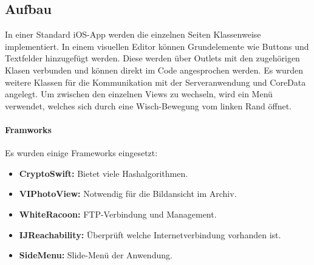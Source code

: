 \subsection{Aufbau}
In einer Standard iOS-App werden die einzelnen Seiten Klassenweise implementiert. In einem visuellen Editor können Grundelemente wie Buttons und Textfelder hinzugefügt werden. Diese werden über Outlets mit den zugehörigen Klasen verbunden und können direkt im Code angesprochen werden. Es wurden weitere Klassen für die Kommunikation mit der Serveranwendung und CoreData angelegt. Um zwischen den einzelnen Views zu wechseln, wird ein Menü verwendet, welches sich durch eine Wisch-Bewegung vom linken Rand öffnet. 

\paragraph{Framworks} Es wurden einige Frameworks eingesetzt:
\begin{itemize}
	\item \textbf{CryptoSwift:} Bietet viele Hashalgorithmen. 
	\item \textbf{VIPhotoView:} Notwendig für die Bildansicht im Archiv.
	\item \textbf{WhiteRacoon:} FTP-Verbindung und Management.
	\item \textbf{IJReachability:} Überprüft welche Internetverbindung vorhanden ist.
	\item \textbf{SideMenu:} Slide-Menü der Anwendung.
\end{itemize}

